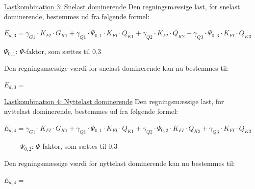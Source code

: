 \underline{Lastkombination 3: Snelast dominerende}
\newline
Den regningsmæssige last, for snelast dominerende, bestemmes ud fra følgende formel:
\begin{center}
 	$E_{d,3}=\gamma_{G1}\cdot K_{FI}\cdot G_{K1}+\gamma_{Q1}\cdot \Psi_{0,1}\cdot K_{FI}\cdot Q_{K1}+\gamma_{Q2}\cdot K_{FI}\cdot Q_{K2}+\gamma_{Q3}\cdot \Psi_{0,3}\cdot K_{FI}\cdot Q_{K3}$
\end{center}
\begin{itemize}
	$\Psi_{0,1}$: $\Psi$-faktor, som sættes til 0,3 \citep[ tabel A 1.1 anneks A.1.2.2]{EU90}
\end{itemize}
Den regningsmæssige værdi for snelast dominerende kan nu bestemmes til:
\begin{center}
	$E_{d,3}=$
\end{center}

\underline{Lastkombination 4: Nyttelast dominerende}
\newline
Den regningsmæssige last, for nyttelast dominerende, bestemmes ud fra følgende formel:
\begin{center}
	$E_{d,4}=\gamma_{G1}\cdot K_{FI}\cdot G_{K1}+\gamma_{Q1}\cdot \Psi_{0,1}\cdot K_{FI}\cdot Q_{K1}+\gamma_{Q2}\cdot \Psi_{0,2}\cdot K_{FI}\cdot Q_{K2}+\gamma_{Q3}\cdot K_{FI}\cdot Q_{K3}$
\end{center}
\begin{itemize}
	\item[-] $\Psi_{0,2}$: $\Psi$-faktor, som sættes til 0,3 \citep[ tabel A 1.1 anneks A.1.2.2]{EU90}
\end{itemize}
Den regningsmæssige værdi for nyttelast dominerende kan nu bestemmes til:
\begin{itemize}
	$E_{d,4}=$
\end{itemize}